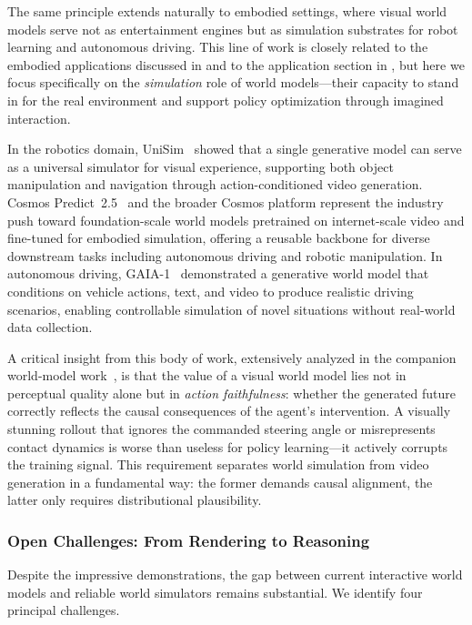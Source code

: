 \documentclass{llmxive}
\begin{document}
The same principle extends naturally to embodied settings, where visual world models serve not as entertainment engines but as simulation substrates for robot learning and autonomous driving. This line of work is closely related to the embodied applications discussed in  and to the application section in , but here we focus specifically on the \emph{simulation} role of world models---their capacity to stand in for the real environment and support policy optimization through imagined interaction.

In the robotics domain, UniSim~\citep{yang2024unisim} showed that a single generative model can serve as a universal simulator for visual experience, supporting both object manipulation and navigation through action-conditioned video generation. Cosmos Predict~2.5~\citep{CosmosPredict} and the broader Cosmos platform represent the industry push toward foundation-scale world models pretrained on internet-scale video and fine-tuned for embodied simulation, offering a reusable backbone for diverse downstream tasks including autonomous driving and robotic manipulation. In autonomous driving, GAIA-1~\citep{hu2024gaia1} demonstrated a generative world model that conditions on vehicle actions, text, and video to produce realistic driving scenarios, enabling controllable simulation of novel situations without real-world data collection.

A critical insight from this body of work, extensively analyzed in the companion world-model work~\citep{meietal2026videoroboticsurvey}, is that the value of a visual world model lies not in perceptual quality alone but in \emph{action faithfulness}: whether the generated future correctly reflects the causal consequences of the agent's intervention. A visually stunning rollout that ignores the commanded steering angle or misrepresents contact dynamics is worse than useless for policy learning---it actively corrupts the training signal. This requirement separates world simulation from video generation in a fundamental way: the former demands causal alignment, the latter only requires distributional plausibility.

\subsubsection{Open Challenges: From Rendering to Reasoning}

Despite the impressive demonstrations, the gap between current interactive world models and reliable world simulators remains substantial. We identify four principal challenges.
\end{document}
